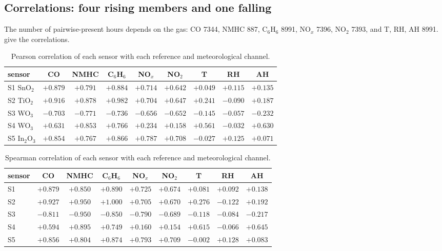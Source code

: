 \documentclass[11pt]{article}
\theoremstyle{definition}\newtheorem{definition}[theorem]{Definition}
\theoremstyle{remark}\newtheorem{remark}[theorem]{Remark}
\begin{document}
\subsection{Correlations: four rising members and one falling}\label{sec:corr}
The number of pairwise-present hours depends on the gas: CO 7344, NMHC 887, C$_6$H$_6$ 8991, NO$_x$ 7396, NO$_2$ 7393, and T, RH, AH 8991.  give the correlations.

\begin{table}[htbp]\centering
\caption{Pearson correlation of each sensor with each reference and meteorological channel.}\label{tab:pearson}
\small
\begin{tabular}{@{}lcccccccc@{}}\toprule
sensor & CO & NMHC & C$_6$H$_6$ & NO$_x$ & NO$_2$ & T & RH & AH\\\midrule
S1 SnO$_2$ & $+0.879$ & $+0.791$ & $+0.884$ & $+0.714$ & $+0.642$ & $+0.049$ & $+0.115$ & $+0.135$\\
S2 TiO$_2$ & $+0.916$ & $+0.878$ & $+0.982$ & $+0.704$ & $+0.647$ & $+0.241$ & $-0.090$ & $+0.187$\\
S3 WO$_3$ & $-0.703$ & $-0.771$ & $-0.736$ & $-0.656$ & $-0.652$ & $-0.145$ & $-0.057$ & $-0.232$\\
S4 WO$_3$ & $+0.631$ & $+0.853$ & $+0.766$ & $+0.234$ & $+0.158$ & $+0.561$ & $-0.032$ & $+0.630$\\
S5 In$_2$O$_3$ & $+0.854$ & $+0.767$ & $+0.866$ & $+0.787$ & $+0.708$ & $-0.027$ & $+0.125$ & $+0.071$\\\bottomrule
\end{tabular}
\end{table}

\begin{table}[htbp]\centering
\caption{Spearman correlation of each sensor with each reference and meteorological channel.}\label{tab:spearman}
\small
\begin{tabular}{@{}lcccccccc@{}}\toprule
sensor & CO & NMHC & C$_6$H$_6$ & NO$_x$ & NO$_2$ & T & RH & AH\\\midrule
S1 & $+0.879$ & $+0.850$ & $+0.890$ & $+0.725$ & $+0.674$ & $+0.081$ & $+0.092$ & $+0.138$\\
S2 & $+0.927$ & $+0.950$ & $\mathbf{+1.000}$ & $+0.705$ & $+0.670$ & $+0.276$ & $-0.122$ & $+0.192$\\
S3 & $-0.811$ & $-0.950$ & $-0.850$ & $-0.790$ & $-0.689$ & $-0.118$ & $-0.084$ & $-0.217$\\
S4 & $+0.594$ & $+0.895$ & $+0.749$ & $+0.160$ & $+0.154$ & $+0.615$ & $-0.066$ & $+0.645$\\
S5 & $+0.856$ & $+0.804$ & $+0.874$ & $+0.793$ & $+0.709$ & $-0.002$ & $+0.128$ & $+0.083$\\\bottomrule
\end{tabular}
\end{table}
\end{document}
